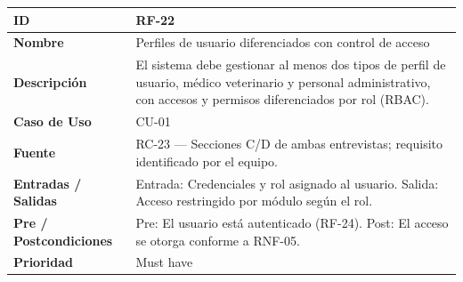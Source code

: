 \documentclass[
]{article}
\newcounter{none} %
\begin{document}
{\def\LTcaptype{none} %
\begin{longtable}[]{|
  >{\raggedright\arraybackslash}p{}|
  >{\raggedright\arraybackslash}p{}|}
\hline
\begin{minipage}[b]{\linewidth}\raggedright
\textbf{ID}
\end{minipage} & \begin{minipage}[b]{\linewidth}\raggedright
RF-22
\end{minipage} \\
\hline
\endhead
\hline
\endlastfoot
\textbf{Nombre} & \begin{minipage}[t]{\linewidth}\raggedright
Perfiles de usuario diferenciados con control de acceso
\end{minipage} \\
\hline
\textbf{Descripción} & \begin{minipage}[t]{\linewidth}\raggedright
El sistema debe gestionar al menos dos tipos de perfil de usuario, médico veterinario y personal administrativo, con accesos y permisos diferenciados por rol (RBAC).
\end{minipage} \\
\hline
\textbf{Caso de Uso} & \begin{minipage}[t]{\linewidth}\raggedright
CU-01
\end{minipage} \\
\hline
\textbf{Fuente} & \begin{minipage}[t]{\linewidth}\raggedright
RC-23 — Secciones C/D de ambas entrevistas; requisito identificado por el equipo.
\end{minipage} \\
\hline
\textbf{Entradas / Salidas} & \begin{minipage}[t]{\linewidth}\raggedright
Entrada: Credenciales y rol asignado al usuario. Salida: Acceso restringido por módulo según el rol.
\end{minipage} \\
\hline
\textbf{Pre / Postcondiciones} & \begin{minipage}[t]{\linewidth}\raggedright
Pre: El usuario está autenticado (RF-24). Post: El acceso se otorga conforme a RNF-05.
\end{minipage} \\
\hline
\textbf{Prioridad} & \begin{minipage}[t]{\linewidth}\raggedright
Must have
\end{minipage} \\

\end{longtable}}
\end{document}
